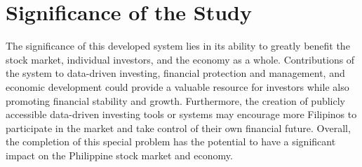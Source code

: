\section{Significance of the Study}
\label{sec:significance}
The significance of this developed system lies in its ability to greatly benefit 
the stock market, individual investors, and the economy as a whole. 
Contributions of the system to data-driven investing, financial protection 
and management, and economic development could provide a valuable resource for 
investors while also promoting financial stability and growth. Furthermore, 
the creation of publicly accessible data-driven investing tools or systems may encourage 
more Filipinos to participate in the market and take control of their own 
financial future. Overall, the completion of this special problem has the 
potential to have a significant impact on the Philippine stock market and economy.
\hfill \\


